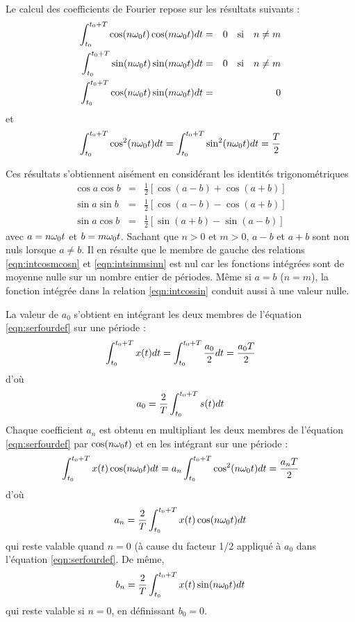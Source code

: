 Le calcul des coefficients de Fourier repose sur les résultats suivants :
\begin{eqnarray}
\label{eqn:intcosmcosn}
\int_{t_0}^{t_0+T} \cos(n\omega_0 t)\cos(m\omega_0 t) dt & = & 0 \quad\mbox{si}\quad n \ne m \\
\label{eqn:intsinmsinn}
\int_{t_0}^{t_0+T} \sin(n\omega_0 t)\sin(m\omega_0 t) dt & = & 0 \quad\mbox{si}\quad n \ne m \\
\label{eqn:intcossin}
\int_{t_0}^{t_0+T} \cos(n\omega_0 t)\sin(m\omega_0 t) dt & = & 0
\end{eqnarray}
et
\begin{equation}
\label{eqn:intcossqr}
\int_{t_0}^{t_0+T} \cos^2(n\omega_0 t) dt = \int_{t_0}^{t_0+T} \sin^2(n\omega_0 t) dt = \frac{T}{2}
\end{equation}

Ces résultats s'obtiennent aisément en considérant les identités trigonométriques
\begin{eqnarray}
\cos a \cos b & = & \frac{1}{2}\left[ \cos(a-b) + \cos(a+b) \right] \\
\sin a \sin b & = & \frac{1}{2}\left[ \cos(a-b) - \cos(a+b) \right] \\
\sin a \cos b & = & \frac{1}{2}\left[ \sin(a+b) - \sin(a-b) \right]
\end{eqnarray}
avec $a = n\omega_0 t$ et $b = m\omega_0 t$.
Sachant que $n > 0$ et $m > 0$, $a-b$ et $a+b$ sont non nuls lorsque $a \ne b$.
Il en résulte que le membre de gauche des relations \ref{eqn:intcosmcosn}
et \ref{eqn:intsinmsinn} est nul car les fonctions intégrées sont de moyenne nulle
sur un nombre entier de périodes.
Même si $a = b$ ($n = m$), la fonction intégrée dans la relation \ref{eqn:intcossin}
conduit aussi à une valeur nulle.

La valeur de $a_0$ s'obtient en intégrant les deux membres de l'équation
\ref{eqn:serfourdef} sur une période :
\begin{equation}
\int_{t_0}^{t_0+T} x(t) dt = \int_{t_0}^{t_0+T} \frac{a_0}{2} dt = \frac{a_0 T}{2} 
\end{equation}
d'où
\begin{equation}
\label{eqn:coeffazero}
a_0 = \frac{2}{T}\int_{t_0}^{t_0+T} s(t) dt 
\end{equation}
Chaque coefficient $a_n$ est obtenu en multipliant les deux membres de l'équation
\ref{eqn:serfourdef} par $\cos(n \omega_0 t)$ et en les intégrant sur une période :
\begin{equation}
\int_{t_0}^{t_0+T} x(t) \cos(n \omega_0 t)dt = a_n\int_{t_0}^{t_0+T} \cos^2(n\omega_0 t) dt = \frac{a_n T}{2}
\end{equation}
d'où
\begin{equation}
\label{eqn:coeffan}
a_n = \frac{2}{T}\int_{t_0}^{t_0+T} x(t) \cos(n\omega_0 t) dt
\end{equation}
qui reste valable quand $n=0$ (à cause du facteur 1/2 appliqué à $a_0$ dans
l'équation \ref{eqn:serfourdef}.
De même,
\begin{equation}
\label{eqn:coeffbn}
b_n = \frac{2}{T}\int_{t_0}^{t_0+T} x(t) \sin(n\omega_0 t) dt
\end{equation}
qui reste valable si $n=0$, en définissant $b_0 = 0$.

